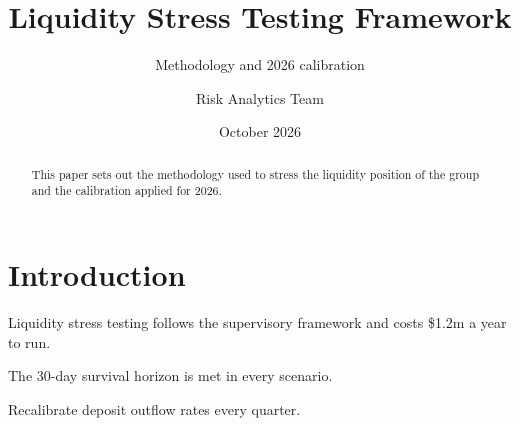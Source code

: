 \documentclass{whitepaper}
\title{Liquidity Stress Testing Framework}
\subtitle{Methodology and 2026 calibration}
\author{Risk Analytics Team}
\date{October 2026}
\begin{document}
\maketitle

\begin{abstract}
This paper sets out the methodology used to stress the liquidity position
of the group and the calibration applied for 2026.
\end{abstract}

\section{Introduction}

Liquidity stress testing follows the supervisory framework
\citep{bcbs2013} and costs \$1.2m a year to run.

\begin{keyfinding}
The 30-day survival horizon is met in every scenario.
\end{keyfinding}

\begin{recommendation}
Recalibrate deposit outflow rates every quarter.
\end{recommendation}


\end{document}
